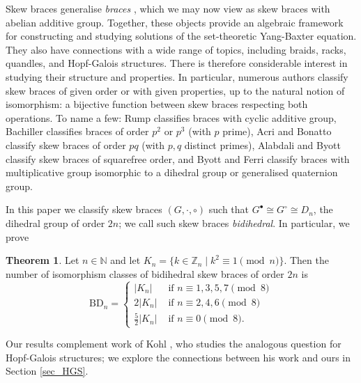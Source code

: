 \documentclass[reqno]{amsart}
\theoremstyle{definition}
\newtheorem{theorem}{Theorem}[section]
\newcommand{\N}{\mathbb{N}}
\newcommand{\Z}{\mathbb{Z}}
\begin{document}
Skew braces generalise \textit{braces} \cite{Ru07a}, which we may now view as skew braces with abelian additive group. Together, these objects provide an algebraic framework for constructing and studying solutions of the set-theoretic Yang-Baxter equation. They also have connections with a wide range of topics, including braids, racks, quandles,  and Hopf-Galois structures. There is therefore considerable interest in studying their structure and properties. In particular, numerous authors classify skew braces of given order or with given properties, up to the natural notion of isomorphism: a bijective function between skew braces respecting both operations. To name a few: Rump \cite{Ru07b} classifies braces with cyclic additive group, Bachiller \cite{Ba15} classifies braces of order $ p^{2} $ or $ p^{3} $ (with $ p $ prime), Acri and Bonatto \cite{AcB20} classify skew braces of order $ pq $ (with $ p,q $ distinct primes), Alabdali and Byott \cite{AB20c} classify skew braces of squarefree order, and Byott and Ferri \cite{BF25} classify braces with multiplicative group isomorphic to a dihedral group or generalised quaternion group. 

In this paper we classify skew braces $ (G,\cdot,\circ) $ such that $ G^{\bullet} \cong G^{\circ} \cong D_{n} $, the dihedral group of order $ 2n $; we call such skew braces \textit{bidihedral}. In particular, we prove

\begin{theorem} \label{thm_main_count}
Let $ n \in \N $ and let $ K_{n} = \{ k \in \Z_{n} \mid k^{2} \equiv 1 \pmod{n} \} $. Then the number of isomorphism classes of bidihedral skew braces of order $ 2n $ is 
\[ \mathrm{BD}_n = \left\{ \begin{array}{ll} 
|K_{n}| & \mbox{ if } n \equiv 1,3,5,7 \pmod{8} \\
2 |K_{n}| & \mbox{ if } n \equiv 2,4,6 \pmod{8} \\
\frac{5}{2} |K_{n}| & \mbox{ if } n \equiv 0 \pmod{8}.
\end{array} \right. \] 
\end{theorem}

Our results complement work of Kohl \cite{Ko20}, who studies the analogous question for Hopf-Galois structures; we explore the connections between his work and ours in Section \ref{sec_HGS}. 
\end{document}
